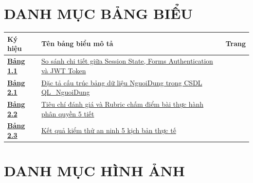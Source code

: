\documentclass[12pt,a4paper]{report}
\begin{document}
\chapter*{DANH MỤC BẢNG BIỂU}
\vspace*{-0.5cm}

\begin{center}
\renewcommand{\arraystretch}{1.25}
\begin{tabularx}{\textwidth}{>{\raggedright\arraybackslash}p{2.5cm} >{\raggedright\arraybackslash}X >{\raggedleft\arraybackslash}p{2.0cm}}
\toprule
\textbf{Ký hiệu} & \textbf{Tên bảng biểu mô tả} & \textbf{Trang} \\
\midrule
\hyperref[tab:ss_vs_forms_jwt]{\textbf{Bảng 1.1}} & \hyperref[tab:ss_vs_forms_jwt]{So sánh chi tiết giữa Session State, Forms Authentication và JWT Token} & \pageref{tab:ss_vs_forms_jwt} \\
\addlinespace
\hyperref[tab:nguoidung_schema]{\textbf{Bảng 2.1}} & \hyperref[tab:nguoidung_schema]{Đặc tả cấu trúc bảng dữ liệu NguoiDung trong CSDL QL\_NguoiDung} & \pageref{tab:nguoidung_schema} \\
\addlinespace
\hyperref[tab:rubric_danhgia]{\textbf{Bảng 2.2}} & \hyperref[tab:rubric_danhgia]{Tiêu chí đánh giá và Rubric chấm điểm bài thực hành phân quyền 5 tiết} & \pageref{tab:rubric_danhgia} \\
\addlinespace
\hyperref[tab:test_cases]{\textbf{Bảng 2.3}} & \hyperref[tab:test_cases]{Kết quả kiểm thử an ninh 5 kịch bản thực tế} & \pageref{tab:test_cases} \\
\bottomrule
\end{tabularx}
\end{center}
\newpage

\chapter*{DANH MỤC HÌNH ẢNH}
\vspace*{-0.5cm}
\end{document}
